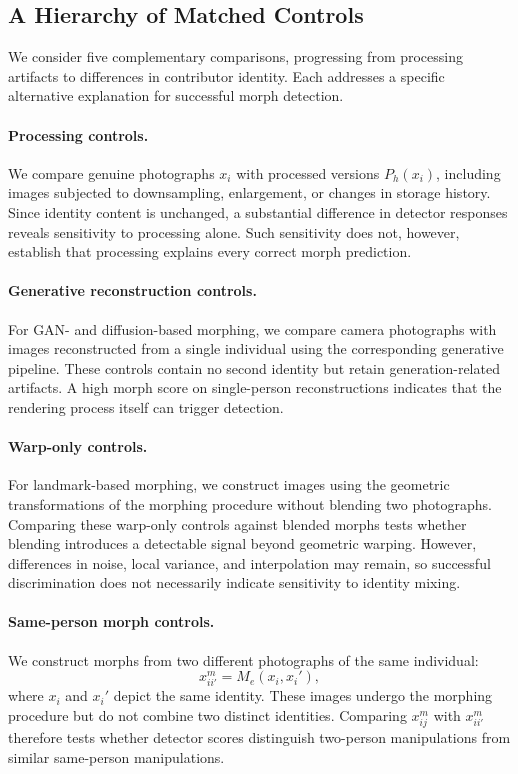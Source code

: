 \subsection{A Hierarchy of Matched Controls}
\label{sec:matched_controls}

We consider five complementary comparisons, progressing
from processing artifacts to differences in contributor
identity. Each addresses a specific alternative explanation
for successful morph detection.




\paragraph{Processing controls.}
We compare genuine photographs $x_i$ with processed
versions $P_h(x_i)$, including images subjected to
downsampling, enlargement, or changes in storage history.
Since identity content is unchanged, a substantial
difference in detector responses reveals sensitivity to
processing alone. Such sensitivity does not, however,
establish that processing explains every correct morph
prediction.

\paragraph{Generative reconstruction controls.}
For GAN- and diffusion-based morphing, we compare camera
photographs with images reconstructed from a single
individual using the corresponding generative pipeline.
These controls contain no second identity but retain
generation-related artifacts. A high morph score on
single-person reconstructions indicates that the rendering
process itself can trigger detection.

\paragraph{Warp-only controls.}
For landmark-based morphing, we construct images using
the geometric transformations of the morphing procedure
without blending two photographs. Comparing these
warp-only controls against blended morphs tests whether
blending introduces a detectable signal beyond geometric
warping. However, differences in noise, local variance,
and interpolation may remain, so successful discrimination
does not necessarily indicate sensitivity to identity mixing.

\paragraph{Same-person morph controls.}
We construct morphs from two different photographs of the
same individual:
\begin{equation}
    x_{ii'}^{m} = M_e(x_i,x_i'),
\end{equation}
where $x_i$ and $x_i'$ depict the same identity.
These images undergo the morphing procedure but do not
combine two distinct identities. Comparing
$x_{ij}^{m}$ with $x_{ii'}^{m}$ therefore tests whether
detector scores distinguish two-person manipulations
from similar same-person manipulations.

